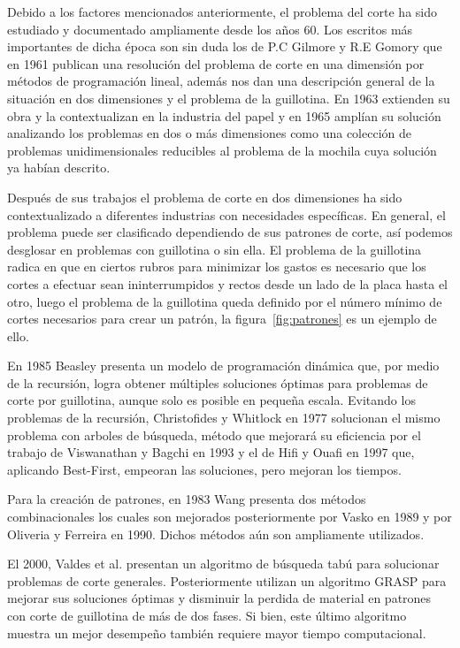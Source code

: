 \documentclass[journal, 10pt]{IEEEtran}
\begin{document}
	Debido a los factores mencionados anteriormente, el problema del corte ha
	sido estudiado y documentado ampliamente desde los años 60. Los escritos más
	importantes de dicha época son sin duda los de P.C Gilmore y R.E Gomory
	que en 1961 publican una resolución del problema de corte en una dimensión 
	por métodos de programación lineal, además nos dan una descripción general
	de la situación en dos dimensiones y el problema de la 
	guillotina\cite{Gilmore:1961}. 
	En 1963 extienden su obra y la contextualizan en la industria del
	papel\cite{Gilmore:1963} y en 1965 amplían su solución analizando los 
	problemas en dos o más dimensiones como una colección de problemas
	unidimensionales\cite{Gilmore:1965} reducibles al problema de la mochila 
	cuya solución ya habían descrito.
	
	Después de sus trabajos el problema de corte en dos dimensiones ha sido
	contextualizado a diferentes industrias con necesidades específicas. En
	general, el problema puede ser clasificado dependiendo de sus patrones de
	corte, así podemos desglosar en problemas con guillotina o sin ella. El
	problema de la guillotina radica en que en ciertos rubros para minimizar los
	gastos es necesario que los cortes a efectuar sean ininterrumpidos y rectos
	desde un lado de la placa hasta el otro, luego el problema de la guillotina
	queda definido por el número mínimo de cortes necesarios para crear un 
	patrón, la figura~\ref{fig:patrones} es un ejemplo de ello.
	
	
	En 1985 Beasley presenta un modelo de programación dinámica que, por medio
	de la recursión, logra obtener múltiples soluciones óptimas para problemas
	de corte por guillotina\cite{Beasley:1985}, aunque solo es posible en
	pequeña escala. Evitando los problemas de la recursión, Christofides y
	Whitlock\cite{Chris:1977} en 1977 solucionan el mismo problema con arboles
	de búsqueda, método que mejorará su eficiencia por el trabajo de
	Viswanathan y Bagchi en 1993\cite{Viswa:1993} y el de Hifi y Ouafi en 
	1997\cite{Hifi:1997} que, aplicando Best-First, empeoran las soluciones, 
	pero mejoran los tiempos.

	Para la creación de patrones, en 1983 Wang presenta dos métodos
	combinacionales\cite{Wang:1983} los cuales son mejorados posteriormente 
	por Vasko\cite{Vasco:1989} en 1989 y por Oliveria y 
	Ferreira\cite{Olib:1990} en 1990. Dichos métodos aún son ampliamente
	utilizados.

	El 2000, Valdes et al.\cite{Valdes:2000} presentan un algoritmo de búsqueda
	tabú\cite{Golver:1997} para solucionar problemas de corte generales.
	Posteriormente utilizan un algoritmo GRASP\cite{Feo:1989} para mejorar sus
	soluciones óptimas y disminuir la perdida de material en patrones con corte
	de guillotina de más de dos fases. Si bien, este último algoritmo muestra un
	mejor desempeño también requiere mayor tiempo computacional.
\end{document}
